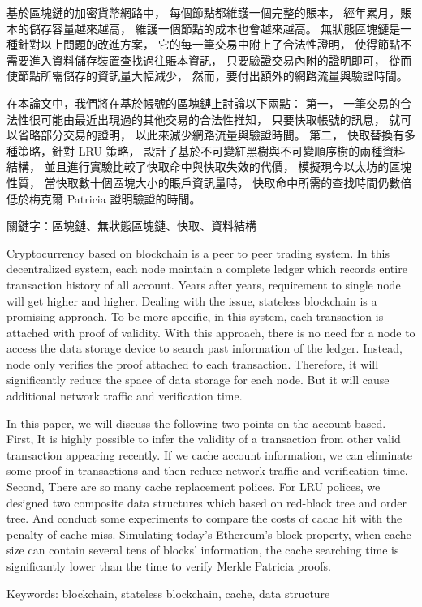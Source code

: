 \begin{abstractzh}
基於區塊鏈的加密貨幣網路中，
每個節點都維護一個完整的賬本，
經年累月，賬本的儲存容量越來越高，
維護一個節點的成本也會越來越高。
無狀態區塊鏈是一種針對以上問題的改進方案，
它的每一筆交易中附上了合法性證明，
使得節點不需要進入資料儲存裝置查找過往賬本資訊，
只要驗證交易內附的證明即可，
從而使節點所需儲存的資訊量大幅減少，
然而，要付出額外的網路流量與驗證時間。

在本論文中，我們將在基於帳號的區塊鏈上討論以下兩點：
第一，
一筆交易的合法性很可能由最近出現過的其他交易的合法性推知，
只要快取帳號的訊息，
就可以省略部分交易的證明，
以此來減少網路流量與驗證時間。
第二，
快取替換有多種策略，針對 LRU 策略，
設計了基於不可變紅黑樹與不可變順序樹的兩種資料結構，
並且進行實驗比較了快取命中與快取失效的代價，
模擬現今以太坊的區塊性質，
當快取數十個區塊大小的賬戶資訊量時，
快取命中所需的查找時間仍數倍低於梅克爾 Patricia 證明驗證的時間。


\bigbreak
\noindent
關鍵字：區塊鏈、無狀態區塊鏈、快取、資料結構
\end{abstractzh}

\begin{abstracten}

Cryptocurrency based on blockchain is a peer to peer trading
system. In this decentralized system,
each node maintain a complete ledger which
records entire transaction history of all account.
Years after years, requirement to single node will
get higher and higher. Dealing with the issue, stateless
blockchain is a promising approach. To be more specific,
in this system, each transaction is attached with proof
of validity. With this approach, there is no need for a node
to access the data storage device to search past information
of the ledger. Instead, node only verifies the proof attached
to each transaction. Therefore, it will significantly
reduce the space of data storage for each node.
But it will cause additional network traffic and
verification time.

In this paper, we will discuss the following two points
on the account-based.
First,
It is highly possible to infer the validity of
a transaction from other valid transaction appearing recently.
If we cache account information, we can eliminate some
proof in transactions and then reduce network traffic
and verification time.
Second,
There are so many cache replacement polices.
For LRU polices, we designed two composite data
structures which based on red-black tree and order tree.
And conduct some experiments to compare the costs of
cache hit with the penalty of cache miss.
Simulating today's Ethereum's block property,
when cache size can contain several tens of blocks' information,
the cache searching time is significantly lower than
the time to verify Merkle Patricia proofs.

\bigbreak
\noindent
Keywords: blockchain, stateless blockchain, cache, data structure
\end{abstracten}

